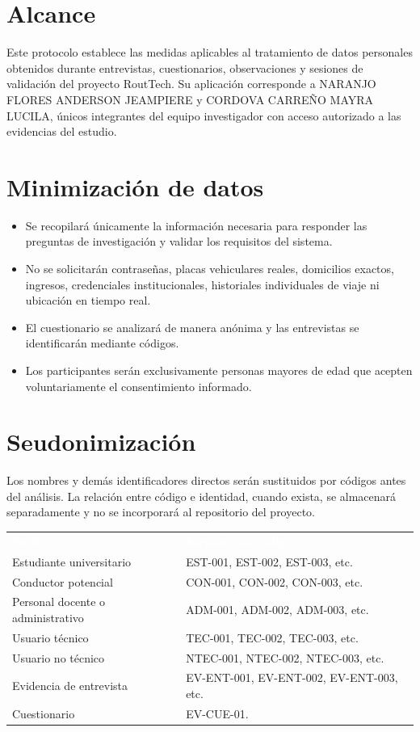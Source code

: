 \documentclass[10pt,a4paper]{article}
\newcommand{\Anderson}{NARANJO FLORES ANDERSON JEAMPIERE}
\newcommand{\Mayra}{CORDOVA CARREÑO MAYRA LUCILA}
\begin{document}
\section{Alcance}

Este protocolo establece las medidas aplicables al tratamiento de datos personales obtenidos durante entrevistas, cuestionarios, observaciones y sesiones de validación del proyecto RoutTech. Su aplicación corresponde a \Anderson{} y \Mayra{}, únicos integrantes del equipo investigador con acceso autorizado a las evidencias del estudio.

\section{Minimización de datos}

\begin{itemize}
  \item Se recopilará únicamente la información necesaria para responder las preguntas de investigación y validar los requisitos del sistema.
  \item No se solicitarán contraseñas, placas vehiculares reales, domicilios exactos, ingresos, credenciales institucionales, historiales individuales de viaje ni ubicación en tiempo real.
  \item El cuestionario se analizará de manera anónima y las entrevistas se identificarán mediante códigos.
  \item Los participantes serán exclusivamente personas mayores de edad que acepten voluntariamente el consentimiento informado.
\end{itemize}

\section{Seudonimización}

Los nombres y demás identificadores directos serán sustituidos por códigos antes del análisis. La relación entre código e identidad, cuando exista, se almacenará separadamente y no se incorporará al repositorio del proyecto.

\noindent\begin{tabularx}{\textwidth}{L{5.2cm} Y}
\textcolor{white}{\textbf{Perfil}} & \textcolor{white}{\textbf{Formato de código}}\\
Estudiante universitario & EST-001, EST-002, EST-003, etc.\\
Conductor potencial & CON-001, CON-002, CON-003, etc.\\
Personal docente o administrativo & ADM-001, ADM-002, ADM-003, etc.\\
Usuario técnico & TEC-001, TEC-002, TEC-003, etc.\\
Usuario no técnico & NTEC-001, NTEC-002, NTEC-003, etc.\\
Evidencia de entrevista & EV-ENT-001, EV-ENT-002, EV-ENT-003, etc.\\
Cuestionario & EV-CUE-01.\\
\end{tabularx}
\end{document}
